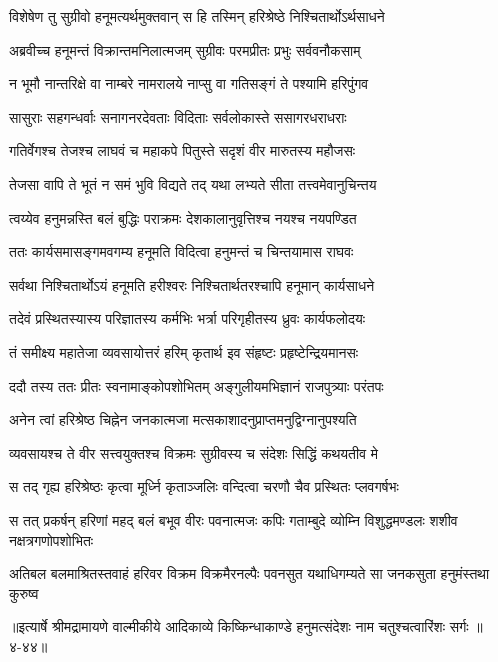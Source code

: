 
\twolineshloka
{विशेषेण तु सुग्रीवो हनूमत्यर्थमुक्तवान्}
{स हि तस्मिन् हरिश्रेष्ठे निश्चितार्थोऽर्थसाधने} %

\twolineshloka
{अब्रवीच्च हनूमन्तं विक्रान्तमनिलात्मजम्}
{सुग्रीवः परमप्रीतः प्रभुः सर्ववनौकसाम्} %

\twolineshloka
{न भूमौ नान्तरिक्षे वा नाम्बरे नामरालये}
{नाप्सु वा गतिसङ्गं ते पश्यामि हरिपुंगव} %

\twolineshloka
{सासुराः सहगन्धर्वाः सनागनरदेवताः}
{विदिताः सर्वलोकास्ते ससागरधराधराः} %

\twolineshloka
{गतिर्वेगश्च तेजश्च लाघवं च महाकपे}
{पितुस्ते सदृशं वीर मारुतस्य महौजसः} %

\twolineshloka
{तेजसा वापि ते भूतं न समं भुवि विद्यते}
{तद् यथा लभ्यते सीता तत्त्वमेवानुचिन्तय} %

\twolineshloka
{त्वय्येव हनुमन्नस्ति बलं बुद्धिः पराक्रमः}
{देशकालानुवृत्तिश्च नयश्च नयपण्डित} %

\twolineshloka
{ततः कार्यसमासङ्गमवगम्य हनूमति}
{विदित्वा हनुमन्तं च चिन्तयामास राघवः} %

\twolineshloka
{सर्वथा निश्चितार्थोऽयं हनूमति हरीश्वरः}
{निश्चितार्थतरश्चापि हनूमान् कार्यसाधने} %

\twolineshloka
{तदेवं प्रस्थितस्यास्य परिज्ञातस्य कर्मभिः}
{भर्त्रा परिगृहीतस्य ध्रुवः कार्यफलोदयः} %

\twolineshloka
{तं समीक्ष्य महातेजा व्यवसायोत्तरं हरिम्}
{कृतार्थ इव संहृष्टः प्रहृष्टेन्द्रियमानसः} %

\twolineshloka
{ददौ तस्य ततः प्रीतः स्वनामाङ्कोपशोभितम्}
{अङ्गुलीयमभिज्ञानं राजपुत्र्याः परंतपः} %

\twolineshloka
{अनेन त्वां हरिश्रेष्ठ चिह्नेन जनकात्मजा}
{मत्सकाशादनुप्राप्तमनुद्विग्नानुपश्यति} %

\twolineshloka
{व्यवसायश्च ते वीर सत्त्वयुक्तश्च विक्रमः}
{सुग्रीवस्य च संदेशः सिद्धिं कथयतीव मे} %

\twolineshloka
{स तद् गृह्य हरिश्रेष्ठः कृत्वा मूर्ध्नि कृताञ्जलिः}
{वन्दित्वा चरणौ चैव प्रस्थितः प्लवगर्षभः} %

\twolineshloka
{स तत् प्रकर्षन् हरिणां महद् बलं बभूव वीरः पवनात्मजः कपिः}
{गताम्बुदे व्योम्नि विशुद्धमण्डलः शशीव नक्षत्रगणोपशोभितः} %

\twolineshloka
{अतिबल बलमाश्रितस्तवाहं हरिवर विक्रम विक्रमैरनल्पैः}
{पवनसुत यथाधिगम्यते सा जनकसुता हनुमंस्तथा कुरुष्व} %


॥इत्यार्षे श्रीमद्रामायणे वाल्मीकीये आदिकाव्ये किष्किन्धाकाण्डे हनुमत्संदेशः नाम चतुश्चत्वारिंशः सर्गः ॥४-४४॥
